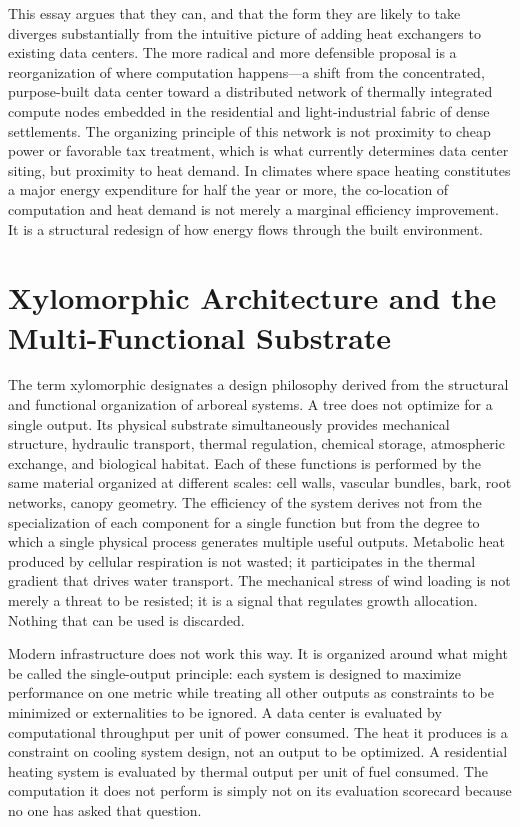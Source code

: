 \documentclass[12pt, oneside]{article}
\begin{document}
This essay argues that they can, and that the form they are likely to take diverges substantially from the intuitive picture of adding heat exchangers to existing data centers. The more radical and more defensible proposal is a reorganization of where computation happens---a shift from the concentrated, purpose-built data center toward a distributed network of thermally integrated compute nodes embedded in the residential and light-industrial fabric of dense settlements. The organizing principle of this network is not proximity to cheap power or favorable tax treatment, which is what currently determines data center siting, but proximity to heat demand. In climates where space heating constitutes a major energy expenditure for half the year or more, the co-location of computation and heat demand is not merely a marginal efficiency improvement. It is a structural redesign of how energy flows through the built environment.

\section{Xylomorphic Architecture and the Multi-Functional Substrate}

The term xylomorphic designates a design philosophy derived from the structural and functional organization of arboreal systems. A tree does not optimize for a single output. Its physical substrate simultaneously provides mechanical structure, hydraulic transport, thermal regulation, chemical storage, atmospheric exchange, and biological habitat. Each of these functions is performed by the same material organized at different scales: cell walls, vascular bundles, bark, root networks, canopy geometry. The efficiency of the system derives not from the specialization of each component for a single function but from the degree to which a single physical process generates multiple useful outputs. Metabolic heat produced by cellular respiration is not wasted; it participates in the thermal gradient that drives water transport. The mechanical stress of wind loading is not merely a threat to be resisted; it is a signal that regulates growth allocation. Nothing that can be used is discarded.

Modern infrastructure does not work this way. It is organized around what might be called the single-output principle: each system is designed to maximize performance on one metric while treating all other outputs as constraints to be minimized or externalities to be ignored. A data center is evaluated by computational throughput per unit of power consumed. The heat it produces is a constraint on cooling system design, not an output to be optimized. A residential heating system is evaluated by thermal output per unit of fuel consumed. The computation it does not perform is simply not on its evaluation scorecard because no one has asked that question.
\end{document}
